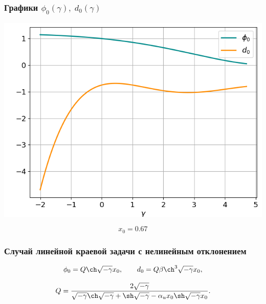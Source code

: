 \documentclass[fullscreen=true, unicode, bookmarks=false]{beamer}
\begin{document}
\begin{frame}
\frametitle { Графики $ \phi_0(\gamma), \; d_0(\gamma) $ }

\begin{center}
\includegraphics[scale=0.53]{divergent_phi0d0_23.png}
\end{center}

$$ x_0=0.67 $$

\end{frame}

\begin{frame}
\frametitle {Случай линейной краевой задачи с нелинейным отклонением }

$$ \phi_0 = Q \ch \sqrt{-\gamma} x_0, \qquad d_0 = Q \beta \ch^3 \sqrt{-\gamma} x_0, $$

$$ Q = \frac{2 \sqrt{-\gamma}}{\sqrt{-\gamma} \ch \sqrt{-\gamma} + \sh \sqrt{-\gamma} - \alpha_u x_0 \sh \sqrt{-\gamma} x_0}. $$

\end{frame}
\end{document}

